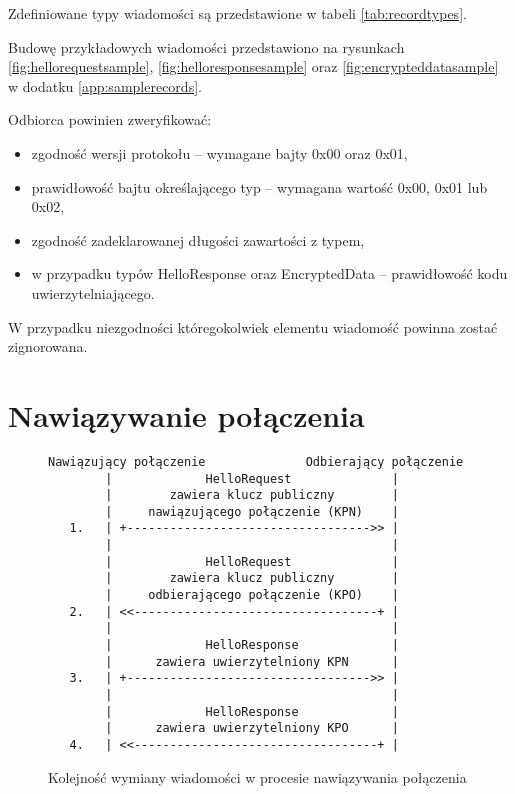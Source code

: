 Zdefiniowane typy wiadomości są przedstawione w tabeli \ref{tab:recordtypes}.

Budowę przykładowych wiadomości przedstawiono na rysunkach \ref{fig:hellorequestsample}, \ref{fig:helloresponsesample} oraz \ref{fig:encrypteddatasample} w dodatku \ref{app:samplerecords}.

Odbiorca powinien zweryfikować:

\begin{itemize}
\item zgodność wersji protokołu -- wymagane bajty 0x00 oraz 0x01,
\item prawidłowość bajtu określającego typ -- wymagana wartość 0x00, 0x01 lub 0x02,
\item zgodność zadeklarowanej długości zawartości z typem,
\item w przypadku typów HelloResponse oraz EncryptedData -- prawidłowość kodu uwierzytelniającego.
\end{itemize}

W przypadku niezgodności któregokolwiek elementu wiadomość powinna zostać zignorowana.

\section{Nawiązywanie połączenia}

\begin{figure}[h]
\centering
\begin{BVerbatim}
Nawiązujący połączenie              Odbierający połączenie
        |             HelloRequest              |
        |        zawiera klucz publiczny        |
        |     nawiązującego połączenie (KPN)    |
   1.   | +---------------------------------->> |
        |                                       |
        |             HelloRequest              |
        |        zawiera klucz publiczny        |
        |     odbierającego połączenie (KPO)    |
   2.   | <<----------------------------------+ |
        |                                       |
        |             HelloResponse             |
        |      zawiera uwierzytelniony KPN      |
   3.   | +---------------------------------->> |
        |                                       |
        |             HelloResponse             |
        |      zawiera uwierzytelniony KPO      |
   4.   | <<----------------------------------+ |
\end{BVerbatim}
\caption{Kolejność wymiany wiadomości w procesie nawiązywania połączenia}
\label{fig:handshake}
\end{figure}

